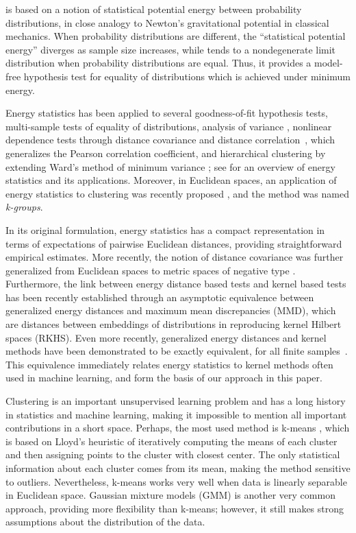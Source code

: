 \documentclass[10pt,journal,compsoc]{IEEEtran}
\begin{document}
 \cite{Szkely2013,Szkely2017}
is based on a 
notion of statistical potential energy between probability distributions,
in close analogy to Newton's gravitational potential in classical mechanics.
When probability distributions are different, the 
``statistical potential energy'' diverges as sample size increases, 
while tends 
to a nondegenerate limit distribution when probability
distributions are equal. 
Thus, it provides a model-free hypothesis test for equality of 
distributions which is achieved under minimum energy. 

Energy statistics has been applied to several goodness-of-fit 
hypothesis tests, multi-sample tests of equality of distributions, 
analysis of variance \cite{RizzoVariance}, nonlinear dependence tests through
distance covariance and distance correlation~\cite{Szekely2007-mm}, which generalizes the Pearson
correlation coefficient, and hierarchical clustering 
by extending Ward's method of minimum variance
\cite{RizzoClustering}; 
see \cite{Szkely2013,Szkely2017} for an overview of energy
statistics and its applications.
Moreover, in Euclidean spaces, an application of 
energy statistics to clustering
was recently proposed \cite{Kgroups}, and the method was named 
\emph{k-groups}. 

In its original formulation, energy statistics has a compact representation
in terms of expectations of pairwise Euclidean distances, providing
straightforward empirical estimates. 
More recently, the notion of distance covariance was further 
generalized from Euclidean 
spaces to metric spaces of negative type \cite{Lyons}. Furthermore, 
the link between energy distance based tests and kernel 
based tests has 
been recently established \cite{Sejdinovic2013} 
through an asymptotic equivalence between generalized energy distances and maximum
mean discrepancies (MMD), which are distances between embeddings of 
distributions in reproducing kernel Hilbert spaces (RKHS).
Even more recently, generalized energy distances and kernel methods have been demonstrated to be exactly equivalent, for all finite samples~\cite{Shen2018-st}.
This equivalence immediately relates energy statistics to
kernel methods often used in machine learning, and form the basis 
of our approach in this paper.

Clustering is an important unsupervised learning problem and 
has a long history in statistics and machine learning, making it
impossible to mention all important contributions in a short space. 
Perhaps, the most used method is k-means \cite{Lloyd,MacQueen,Forgy}, which
is based on Lloyd's heuristic \cite{Lloyd} of iteratively computing
the means of each cluster and then assigning points to
the cluster with closest center. The only statistical 
information about each cluster comes from its mean, making the method sensitive 
to outliers. Nevertheless, k-means works very well when data is 
linearly separable in Euclidean space. Gaussian mixture models (GMM) is 
another very common approach, providing more flexibility than k-means; 
however, it still makes strong assumptions about the distribution of 
the data.
\end{document}
